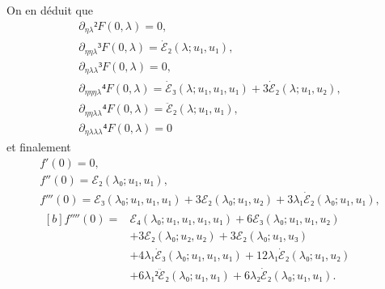 \documentclass[12pt, final]{scrartcl}
\theoremstyle{definition}
\begin{document}
On en déduit que
\begin{gather}
  ∂_{ηλ}² F(0, λ) = 0,\\
  ∂_{ηηλ}³ F(0, λ) = \dot{ℰ}₂(λ; u₁, u₁),\\
  ∂_{ηλλ}³ F(0, λ) = 0,\\
  ∂_{ηηηλ}⁴ F(0, λ) = \dot{ℰ}₃(λ; u₁, u₁, u₁) + 3\dot{ℰ}₂(λ; u₁, u₂),\\
  ∂_{ηηλλ}⁴ F(0, λ) = \ddot{ℰ}₂(λ; u₁, u₁),\\
  ∂_{ηλλλ}⁴ F(0, λ) = 0
\end{gather}
et finalement
\begin{gather}
  f'(0) = 0,\\
  f''(0) = ℰ₂(λ₀; u₁, u₁),\\
  f'''(0) =ℰ₃(λ₀; u₁, u₁, u₁) + 3ℰ₂(λ₀; u₁, u₂) + 3λ₁ \dot{ℰ}₂(λ₀; u₁, u₁),\\
  \begin{aligned}[b]
    f''''(0) ={}
    & ℰ₄(λ₀; u₁, u₁, u₁, u₁) + 6ℰ₃(λ₀; u₁, u₁, u₂)\\
    & + 3ℰ₂(λ₀; u₂, u₂) + 3ℰ₂(λ₀; u₁, u₃)\\
    & + 4 λ₁ \dot{ℰ}₃(λ₀; u₁, u₁, u₁) + 12 λ₁ \dot{ℰ}₂(λ₀; u₁, u₂)\\
    & + 6λ₁² \ddot{ℰ}₂(λ₀; u₁, u₁) + 6λ₂ \dot{ℰ}₂(λ₀; u₁, u₁).
  \end{aligned}
\end{gather}
\end{document}
